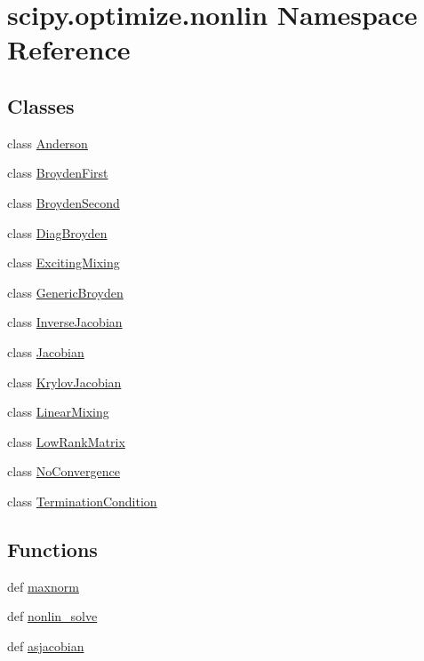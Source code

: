 \hypertarget{namespacescipy_1_1optimize_1_1nonlin}{}\section{scipy.\+optimize.\+nonlin Namespace Reference}
\label{namespacescipy_1_1optimize_1_1nonlin}
\subsection*{Classes}
\begin{DoxyCompactItemize}
\item 
class \hyperlink{classscipy_1_1optimize_1_1nonlin_1_1Anderson}{Anderson}
\item 
class \hyperlink{classscipy_1_1optimize_1_1nonlin_1_1BroydenFirst}{Broyden\+First}
\item 
class \hyperlink{classscipy_1_1optimize_1_1nonlin_1_1BroydenSecond}{Broyden\+Second}
\item 
class \hyperlink{classscipy_1_1optimize_1_1nonlin_1_1DiagBroyden}{Diag\+Broyden}
\item 
class \hyperlink{classscipy_1_1optimize_1_1nonlin_1_1ExcitingMixing}{Exciting\+Mixing}
\item 
class \hyperlink{classscipy_1_1optimize_1_1nonlin_1_1GenericBroyden}{Generic\+Broyden}
\item 
class \hyperlink{classscipy_1_1optimize_1_1nonlin_1_1InverseJacobian}{Inverse\+Jacobian}
\item 
class \hyperlink{classscipy_1_1optimize_1_1nonlin_1_1Jacobian}{Jacobian}
\item 
class \hyperlink{classscipy_1_1optimize_1_1nonlin_1_1KrylovJacobian}{Krylov\+Jacobian}
\item 
class \hyperlink{classscipy_1_1optimize_1_1nonlin_1_1LinearMixing}{Linear\+Mixing}
\item 
class \hyperlink{classscipy_1_1optimize_1_1nonlin_1_1LowRankMatrix}{Low\+Rank\+Matrix}
\item 
class \hyperlink{classscipy_1_1optimize_1_1nonlin_1_1NoConvergence}{No\+Convergence}
\item 
class \hyperlink{classscipy_1_1optimize_1_1nonlin_1_1TerminationCondition}{Termination\+Condition}
\end{DoxyCompactItemize}
\subsection*{Functions}
\begin{DoxyCompactItemize}
\item 
def \hyperlink{namespacescipy_1_1optimize_1_1nonlin_ab4ae82967cd7af096d6cd3ee251716a6}{maxnorm}
\item 
def \hyperlink{namespacescipy_1_1optimize_1_1nonlin_a773112869af5c7af2fbdb3852c3788a3}{nonlin\+\_\+solve}
\item 
def \hyperlink{namespacescipy_1_1optimize_1_1nonlin_adc80c173db9e966077bd0ab5e36ff2ab}{asjacobian}
\end{DoxyCompactItemize}

